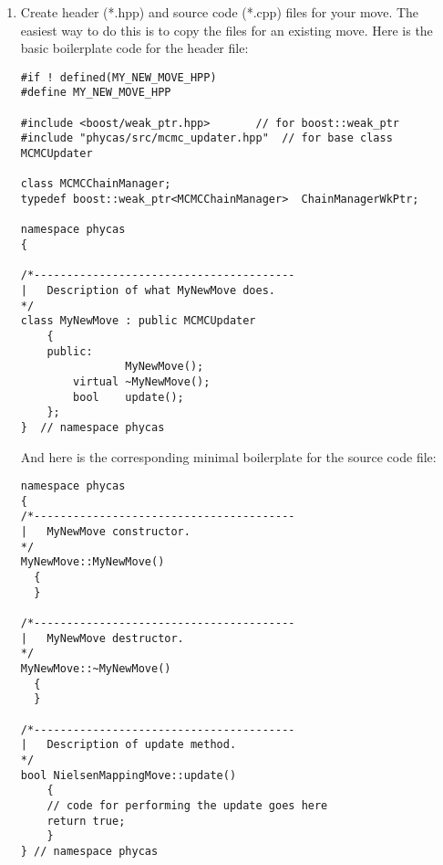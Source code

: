 \begin{enumerate}
\item Create header (*.hpp) and source code (*.cpp) files for your move. The easiest way to do this is to copy the files for an existing move. Here is the basic boilerplate code for the header file:
\begin{verbatim}
#if ! defined(MY_NEW_MOVE_HPP)
#define MY_NEW_MOVE_HPP

#include <boost/weak_ptr.hpp>		// for boost::weak_ptr
#include "phycas/src/mcmc_updater.hpp"	// for base class MCMCUpdater

class MCMCChainManager;
typedef boost::weak_ptr<MCMCChainManager>  ChainManagerWkPtr;

namespace phycas
{

/*----------------------------------------
|   Description of what MyNewMove does.
*/
class MyNewMove : public MCMCUpdater
    {
    public:
                MyNewMove();
        virtual ~MyNewMove();
        bool    update();
    };
}  // namespace phycas
\end{verbatim}
And here is the corresponding minimal boilerplate for the source code file:
\begin{verbatim}
namespace phycas
{
/*----------------------------------------
|   MyNewMove constructor.
*/
MyNewMove::MyNewMove()
  {
  }

/*----------------------------------------
|   MyNewMove destructor.
*/
MyNewMove::~MyNewMove()
  {
  }

/*----------------------------------------
|   Description of update method.
*/
bool NielsenMappingMove::update()
    {
    // code for performing the update goes here
    return true;
    }
} // namespace phycas


\end{verbatim}
\end{enumerate}
